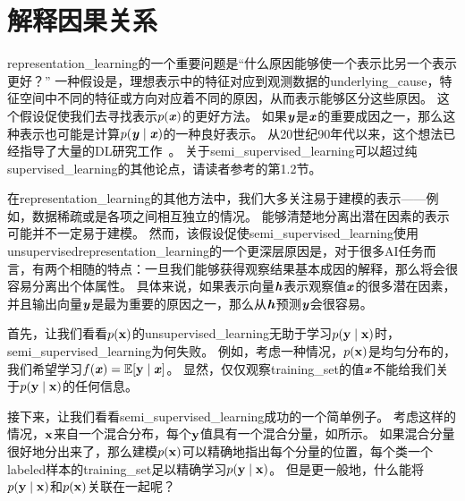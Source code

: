 
\section{解释因果关系}
\label{sec:semi_supervised_disentangling_of_causal_factors}


\gls{representation_learning}的一个重要问题是``什么原因能够使一个表示比另一个表示更好？''
一种假设是，理想表示中的特征对应到观测数据的\gls{underlying_cause}，特征空间中不同的特征或方向对应着不同的原因，从而表示能够区分这些原因。
这个假设促使我们去寻找表示$p(\boldsymbol{\mathit{x}})$的更好方法。
如果$\boldsymbol{\mathit{y}}$是$\boldsymbol{\mathit{x}}$的重要成因之一，那么这种表示也可能是计算$p(\boldsymbol{\mathit{y}} \mid \boldsymbol{\mathit{x}})$的一种良好表示。
从20世纪90年代以来，这个想法已经指导了大量的\gls{DL}研究工作~\citep{Becker92,hinton1999unsupervised}。
关于\gls{semi_supervised_learning}可以超过纯\gls{supervised_learning}的其他论点，请读者参考\cite{Chapelle-2006}的第1.2节。


在\gls{representation_learning}的其他方法中，我们大多关注易于建模的表示——例如，数据稀疏或是各项之间相互独立的情况。
能够清楚地分离出潜在因素的表示可能并不一定易于建模。
然而，该假设促使\gls{semi_supervised_learning}使用\gls{unsupervised}\gls{representation_learning}的一个更深层原因是，对于很多\gls{AI}任务而言，有两个相随的特点：一旦我们能够获得观察结果基本成因的解释，那么将会很容易分离出个体属性。
具体来说，如果表示向量$\boldsymbol{\mathit{h}}$表示观察值$\boldsymbol{\mathit{x}}$的很多潜在因素，并且输出向量$\boldsymbol{\mathit{y}}$是最为重要的原因之一，那么从$\boldsymbol{\mathit{h}}$预测$\boldsymbol{\mathit{y}}$会很容易。


首先，让我们看看$p(\mathbf{x})$的\gls{unsupervised_learning}无助于学习$p(\mathbf{y}\mid\mathbf{x})$时，\gls{semi_supervised_learning}为何失败。
例如，考虑一种情况，$p(\mathbf{x})$是均匀分布的，我们希望学习$f(\boldsymbol{\mathit{x}}) = \mathbb{E}[\mathbf{y} \mid \boldsymbol{\mathit{x}}]$。
显然，仅仅观察\gls{training_set}的值$\boldsymbol{\mathit{x}}$不能给我们关于$p(\mathbf{y} \mid \mathbf{x})$的任何信息。


接下来，让我们看看\gls{semi_supervised_learning}成功的一个简单例子。
考虑这样的情况，$\mathbf{x}$来自一个混合分布，每个$\mathbf{y}$值具有一个混合分量，如所示。
如果混合分量很好地分出来了，那么建模$p(\mathbf{x})$可以精确地指出每个分量的位置，每个类一个\gls{labeled}样本的\gls{training_set}足以精确学习$p(\mathbf{y} \mid \mathbf{x})$。
但是更一般地，什么能将$p(\mathbf{y} \mid \mathbf{x})$和$p(\mathbf{x})$关联在一起呢？


